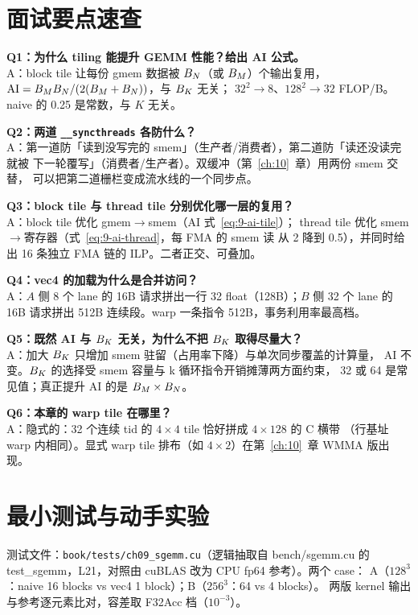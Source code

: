 \section{面试要点速查}

\textbf{Q1：为什么 tiling 能提升 GEMM 性能？给出 AI 公式。}\\
A：block tile 让每份 gmem 数据被 $B\sb{N}$（或 $B\sb{M}$）个输出复用，
$\mathrm{AI} = B\sb{M}B\sb{N} / (2(B\sb{M}+B\sb{N}))$，与 $B\sb{K}$ 无关；
$32^2 \to 8$、$128^2 \to 32$ FLOP/B。naive 的 0.25 是常数，与 $K$ 无关。

\textbf{Q2：两道 \texttt{\_\allowbreak{}\_\allowbreak{}syncthreads} 各防什么？}\\
A：第一道防「读到没写完的 smem」（生产者/消费者），第二道防「读还没读完就被
下一轮覆写」（消费者/生产者）。双缓冲（第~\ref{ch:10}~章）用两份 smem 交替，
可以把第二道栅栏变成流水线的一个同步点。

\textbf{Q3：block tile 与 thread tile 分别优化哪一层的复用？}\\
A：block tile 优化 gmem$\to$smem（AI 式~\ref{eq:9-ai-tile}）；
thread tile 优化 smem$\to$寄存器（式~\ref{eq:9-ai-thread}，每 FMA 的 smem 读
从 2 降到 0.5），并同时给出 16 条独立 FMA 链的 ILP。二者正交、可叠加。

\textbf{Q4：vec4 的加载为什么是合并访问？}\\
A：$A$ 侧 8 个 lane 的 16B 请求拼出一行 32 float（128B）；$B$ 侧 32 个 lane 的
16B 请求拼出 512B 连续段。warp 一条指令 512B，事务利用率最高档。

\textbf{Q5：既然 AI 与 $B\sb{K}$ 无关，为什么不把 $B\sb{K}$ 取得尽量大？}\\
A：加大 $B\sb{K}$ 只增加 smem 驻留（占用率下降）与单次同步覆盖的计算量，
AI 不变。$B\sb{K}$ 的选择受 smem 容量与 k 循环指令开销摊薄两方面约束，
32 或 64 是常见值；真正提升 AI 的是 $B\sb{M} \times B\sb{N}$。

\textbf{Q6：本章的 warp tile 在哪里？}\\
A：隐式的：32 个连续 tid 的 $4 \times 4$ tile 恰好拼成 $4 \times 128$ 的 C 横带
（行基址 warp 内相同）。显式 warp tile 排布（如 $4 \times 2$）在第~\ref{ch:10}~章
WMMA 版出现。

\section{最小测试与动手实验}

测试文件：\texttt{book/\allowbreak{}tests/\allowbreak{}ch09\_\allowbreak{}sgemm.\allowbreak{}cu}（逻辑抽取自 bench/sgemm.cu 的
test\_sgemm，L21，对照由 cuBLAS 改为 CPU fp64 参考）。两个 case：
A（$128^3$：naive 16 blocks vs vec4 1 block）；B（$256^3$：64 vs 4 blocks）。
两版 kernel 输出与参考逐元素比对，容差取 F32Acc 档（$10^{-3}$）。

